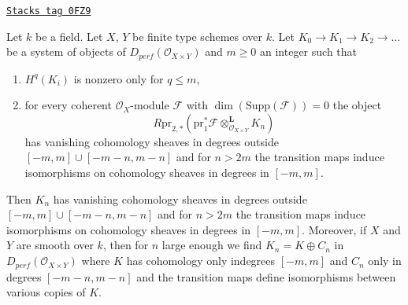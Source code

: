 \begin{lemma}
\label{equiv-lemma-bounded-fibres}
\href{https://stacks.math.columbia.edu/tag/0FZ9}{\texttt{Stacks tag 0FZ9}}

Let $k$ be a field. Let $X$, $Y$ be finite type schemes over $k$.
Let $K_0 \to K_1 \to K_2 \to \ldots$ be a system of objects
of $D_{perf}(\mathcal{O}_{X \times Y})$ and $m \geq 0$ an integer such that
\begin{enumerate}
\item $H^q(K_i)$ is nonzero only for $q \leq m$,
\item for every coherent $\mathcal{O}_X$-module $\mathcal{F}$ with
$\dim(\text{Supp}(\mathcal{F})) = 0$ the object
$$
R\text{pr}_{2, *}(
\text{pr}_1^*\mathcal{F} \otimes_{\mathcal{O}_{X \times Y}}^\mathbf{L}
K_n)
$$
has vanishing cohomology sheaves in degrees outside
$[-m, m] \cup [-m - n, m - n]$ and for $n > 2m$ the transition maps
induce isomorphisms on cohomology sheaves in degrees in $[-m, m]$.
\end{enumerate}
Then $K_n$ has vanishing cohomology sheaves in degrees outside
$[-m, m] \cup [-m - n, m - n]$ and for $n > 2m$ the
transition maps induce isomorphisms on cohomology sheaves in degrees in
$[-m, m]$. Moreover, if $X$ and $Y$ are smooth over $k$, then for $n$
large enough we find $K_n = K \oplus C_n$ in
$D_{perf}(\mathcal{O}_{X \times Y})$
where $K$ has cohomology only indegrees $[-m, m]$ and $C_n$ only in
degrees $[-m - n, m - n]$ and the transition maps
define isomorphisms between various copies of $K$.
\end{lemma}

